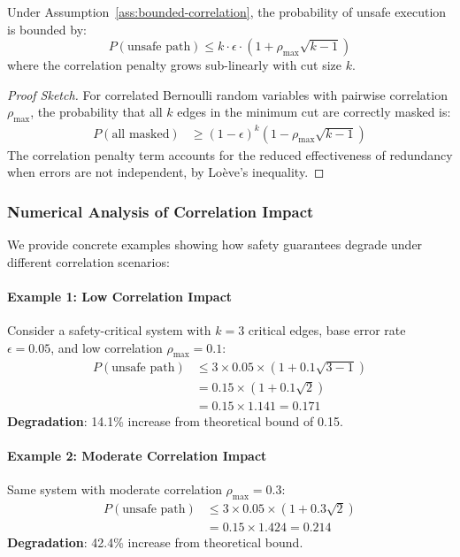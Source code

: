\documentclass{article}
\begin{document}
\begin{theorem}
\label{thm:safety-practical}
Under Assumption~\ref{ass:bounded-correlation}, the probability of unsafe execution is bounded by:
\begin{equation}
\label{eq:correlated-safety-bound}
P(\text{unsafe path}) \leq k \cdot \epsilon \cdot (1 + \rho_{\max} \sqrt{k-1})
\end{equation}
where the correlation penalty grows sub-linearly with cut size $k$.
\end{theorem}

\begin{proof}[Proof Sketch]
For correlated Bernoulli random variables with pairwise correlation $\rho_{\max}$, the probability that all $k$ edges in the minimum cut are correctly masked is:
\begin{align}
P(\text{all masked}) &\geq (1-\epsilon)^k (1 - \rho_{\max}\sqrt{k-1})
\end{align}
The correlation penalty term accounts for the reduced effectiveness of redundancy when errors are not independent, by Loève's inequality.
\end{proof}

\subsubsection{Numerical Analysis of Correlation Impact}

We provide concrete examples showing how safety guarantees degrade under different correlation scenarios:

\paragraph{Example 1: Low Correlation Impact}
Consider a safety-critical system with $k = 3$ critical edges, base error rate $\epsilon = 0.05$, and low correlation $\rho_{\max} = 0.1$:
\begin{align}
P(\text{unsafe path}) &\leq 3 \times 0.05 \times (1 + 0.1\sqrt{3-1}) \\
&= 0.15 \times (1 + 0.1\sqrt{2}) \\
&= 0.15 \times 1.141 = 0.171
\end{align}
\textbf{Degradation}: 14.1\% increase from theoretical bound of 0.15.

\paragraph{Example 2: Moderate Correlation Impact}
Same system with moderate correlation $\rho_{\max} = 0.3$:
\begin{align}
P(\text{unsafe path}) &\leq 3 \times 0.05 \times (1 + 0.3\sqrt{2}) \\
&= 0.15 \times 1.424 = 0.214
\end{align}
\textbf{Degradation}: 42.4\% increase from theoretical bound.
\end{document}
